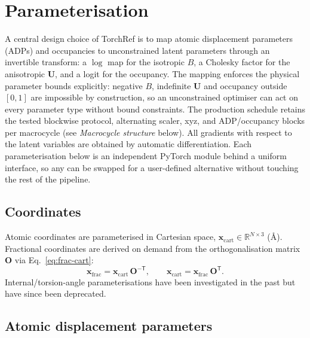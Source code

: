\documentclass{iucrjournals}
\begin{document}
\section{Parameterisation}

A central design choice of TorchRef is to map atomic displacement parameters
(ADPs) and occupancies to unconstrained latent parameters through an invertible
transform: a $\log$ map for the isotropic $B$, a Cholesky factor for the
anisotropic $\mathbf{U}$, and a logit for the occupancy.
The mapping enforces the physical parameter bounds explicitly: negative $B$,
indefinite $\mathbf{U}$ and occupancy outside $[0,1]$ are impossible by
construction, so an unconstrained optimiser can act on every parameter type
without bound constraints. The production schedule retains the tested blockwise
protocol, alternating scaler, xyz, and ADP/occupancy blocks per
macrocycle (see \emph{Macrocycle structure} below).
All gradients with respect to the latent variables are obtained by automatic
differentiation.
Each parameterisation below is an independent PyTorch module behind a uniform
interface, so any can be swapped for a user-defined alternative without touching
the rest of the pipeline.

\subsection{Coordinates}

Atomic coordinates are parameterised in Cartesian space,
$\mathbf{x}_\mathrm{cart} \in \mathbb{R}^{N \times 3}$ (\AA).
Fractional coordinates are derived on demand from the orthogonalisation matrix
$\mathbf{O}$ via Eq.~\ref{eq:frac-cart}:
%
\begin{equation}
  \mathbf{x}_\mathrm{frac} = \mathbf{x}_\mathrm{cart}\,\mathbf{O}^{-\mathsf{T}},
  \qquad
  \mathbf{x}_\mathrm{cart} = \mathbf{x}_\mathrm{frac}\,\mathbf{O}^{\mathsf{T}}.
  \label{eq:frac-cart}
\end{equation}
%
Internal/torsion-angle parameterisations have been investigated in the past but
have since been deprecated.

\subsection{Atomic displacement parameters}
\end{document}
